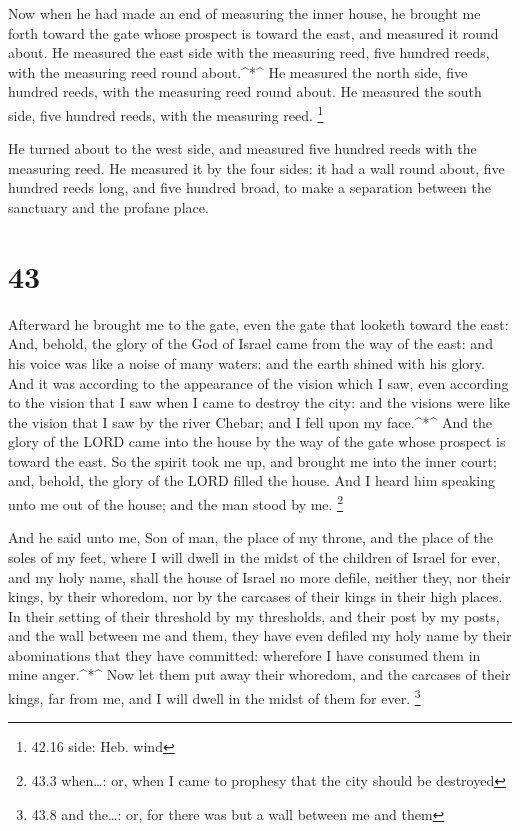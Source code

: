  Now when he had made an end of measuring the inner house,
he brought me forth toward the gate whose prospect is toward the east,
and measured it round about.  He measured the east side
with the measuring reed, five hundred reeds, with the measuring reed
round about.\^{}*\^{}  He measured the north side, five
hundred reeds, with the measuring reed round about.  He
measured the south side, five hundred reeds, with the measuring reed.
\footnote{42.16 side: Heb. wind}

 He turned about to the west side, and measured five
hundred reeds with the measuring reed.  He measured it by
the four sides: it had a wall round about, five hundred reeds long, and
five hundred broad, to make a separation between the sanctuary and the
profane place.

\hypertarget{section-42}{%
\section{43}\label{section-42}}

 Afterward he brought me to the gate, even the gate that
looketh toward the east:  And, behold, the glory of the God
of Israel came from the way of the east: and his voice was like a noise
of many waters: and the earth shined with his glory.  And it
was according to the appearance of the vision which I saw, even
according to the vision that I saw when I came to destroy the city: and
the visions were like the vision that I saw by the river Chebar; and I
fell upon my face.\^{}*\^{}  And the glory of the LORD came
into the house by the way of the gate whose prospect is toward the east.
 So the spirit took me up, and brought me into the inner
court; and, behold, the glory of the LORD filled the house. 
And I heard him speaking unto me out of the house; and the man stood by
me. \footnote{43.3 when\ldots: or, when I came to prophesy that the city
  should be destroyed}

 And he said unto me, Son of man, the place of my throne,
and the place of the soles of my feet, where I will dwell in the midst
of the children of Israel for ever, and my holy name, shall the house of
Israel no more defile, neither they, nor their kings, by their whoredom,
nor by the carcases of their kings in their high places.  In
their setting of their threshold by my thresholds, and their post by my
posts, and the wall between me and them, they have even defiled my holy
name by their abominations that they have committed: wherefore I have
consumed them in mine anger.\^{}*\^{}  Now let them put away
their whoredom, and the carcases of their kings, far from me, and I will
dwell in the midst of them for ever. \footnote{43.8 and the\ldots: or,
  for there was but a wall between me and them}

